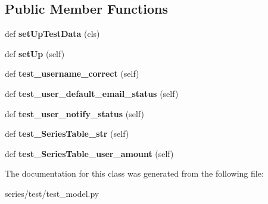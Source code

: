 \subsection*{Public Member Functions}
\begin{DoxyCompactItemize}
\item 
\mbox{\label{classseries_1_1test_1_1test__model_1_1_model_test_a2f0b33085e4a66ce317a234db7a2219c}} 
def {\bfseries set\+Up\+Test\+Data} (cls)
\item 
\mbox{\label{classseries_1_1test_1_1test__model_1_1_model_test_a2e6e174a76fed637f8fb2e9d6d33cef2}} 
def {\bfseries set\+Up} (self)
\item 
\mbox{\label{classseries_1_1test_1_1test__model_1_1_model_test_a71b1fe9f2c64ffd9f8a762171c282fc4}} 
def {\bfseries test\+\_\+username\+\_\+correct} (self)
\item 
\mbox{\label{classseries_1_1test_1_1test__model_1_1_model_test_a7b0a7ca6e96b121825d35f1239015d25}} 
def {\bfseries test\+\_\+user\+\_\+default\+\_\+email\+\_\+status} (self)
\item 
\mbox{\label{classseries_1_1test_1_1test__model_1_1_model_test_a64184d479e3eaa00f17d08132aebfe42}} 
def {\bfseries test\+\_\+user\+\_\+notify\+\_\+status} (self)
\item 
\mbox{\label{classseries_1_1test_1_1test__model_1_1_model_test_a0cf6f5a7110cec128f54e244006dcb82}} 
def {\bfseries test\+\_\+\+Series\+Table\+\_\+str} (self)
\item 
\mbox{\label{classseries_1_1test_1_1test__model_1_1_model_test_a6ff5f83986e6385a5362ca623b1de51d}} 
def {\bfseries test\+\_\+\+Series\+Table\+\_\+user\+\_\+amount} (self)
\end{DoxyCompactItemize}


The documentation for this class was generated from the following file\+:\begin{DoxyCompactItemize}
\item 
series/test/test\+\_\+model.\+py\end{DoxyCompactItemize}
